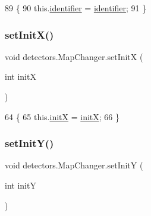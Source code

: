 \begin{DoxyCode}
89                                               \{
90         this.\mbox{\hyperlink{classdetectors_1_1_map_changer_a4c880379dc5b9cdd0c11d388ed7d28ca}{identifier}} = \mbox{\hyperlink{classdetectors_1_1_map_changer_a4c880379dc5b9cdd0c11d388ed7d28ca}{identifier}};
91     \}
\end{DoxyCode}
\mbox{\label{classdetectors_1_1_map_changer_a96d45124191401322f3f9bfc76b3830f}} 
\subsubsection{\texorpdfstring{set\+Init\+X()}{setInitX()}}
{\footnotesize\ttfamily void detectors.\+Map\+Changer.\+set\+InitX (\begin{DoxyParamCaption}\item[{int}]{initX }\end{DoxyParamCaption})\hspace{0.3cm}{\ttfamily [inline]}}


\begin{DoxyCode}
64                                     \{
65         this.\mbox{\hyperlink{classdetectors_1_1_map_changer_a45c8356dc930a1289333a55a1a13a606}{initX}} = \mbox{\hyperlink{classdetectors_1_1_map_changer_a45c8356dc930a1289333a55a1a13a606}{initX}};
66     \}
\end{DoxyCode}
\mbox{\label{classdetectors_1_1_map_changer_a5b0f5e7cd4c82d221683bc224e5ab14a}} 
\subsubsection{\texorpdfstring{set\+Init\+Y()}{setInitY()}}
{\footnotesize\ttfamily void detectors.\+Map\+Changer.\+set\+InitY (\begin{DoxyParamCaption}\item[{int}]{initY }\end{DoxyParamCaption})\hspace{0.3cm}{\ttfamily [inline]}}


